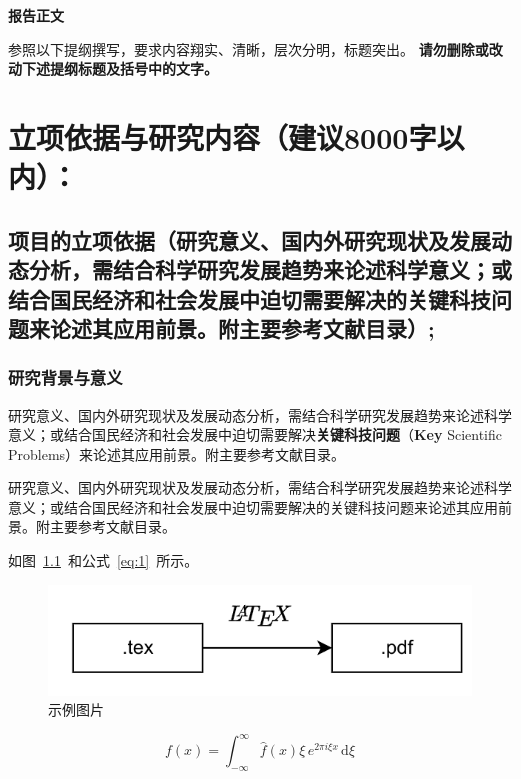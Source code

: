 \documentclass{nsfc}
\begin{document}
\begin{center}
    \Large\kaishu\textbf{报告正文}
\end{center}

\begin{onehalfspace}
    \large\kaishu
    参照以下提纲撰写，要求内容翔实、清晰，层次分明，标题突出。
    {\color{nsfc_blue}\textbf{请勿删除或改动下述提纲标题及括号中的文字。}}
\end{onehalfspace}

\chapter{立项依据与研究内容{\mdseries（建议8000字以内）：}}

\section{\textbf{项目的立项依据}（研究意义、国内外研究现状及发展动态分析，需结合科学研究发展趋势来论述科学意义；或结合国民经济和社会发展中迫切需要解决的关键科技问题来论述其应用前景。附主要参考文献目录）;}

\subsection{研究背景与意义}

研究意义、国内外研究现状及发展动态分析，需结合科学研究发展趋势来论述科学意义；或结合国民经济和社会发展中迫切需要解决\textbf{关键科技问题}（\textbf{Key} Scientific Problems）来论述其应用前景。附主要参考文献目录。

{\kaishu 研究意义、国内外研究现状及发展动态分析，需结合科学研究发展趋势来论述科学意义；或结合国民经济和社会发展中迫切需要解决的关键科技问题来论述其应用前景\cite{latex2e,latex:companion}。附主要参考文献目录。}

如图~\ref{fig:test}~和公式~\eqref{eq:1}~所示。

\begin{figure}[h]
    \centering
    \includegraphics[width=0.4\linewidth]{figure1.png}
    \caption{示例图片}
    \label{fig:test}
\end{figure}

\begin{equation}\label{eq:1}
    f(x) = \int_{-\infty}^\infty  \hat f(x)\xi\,e^{2 \pi i \xi x}  \,\mathrm{d}\xi 
\end{equation}
\end{document}
